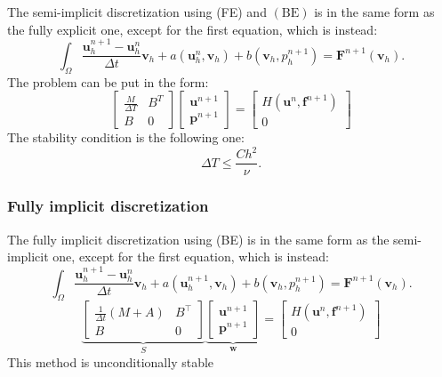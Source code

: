 \documentclass[11pt]{book}
\begin{document}
The semi-implicit discretization using (FE) and $(\mathrm{BE})$ is in the same form as the fully explicit one, except for the first equation, which is instead:
\begin{equation*}
\int_{\Omega} \frac{\mathbf{u}_{h}^{n+1}-\mathbf{u}_{h}^{n}}{\Delta t} \mathbf{v}_{h}+a\left(\mathbf{u}_{h}^{n}, \mathbf{v}_{h}\right)+b\left(\mathbf{v}_{h}, p_{h}^{n+1}\right)=\mathbf{F}^{n+1}\left(\mathbf{v}_{h}\right).
\end{equation*}
The problem can be put in the form:
\begin{equation*}
\begin{bmatrix}
\frac{M}{\Delta T} & B^{T} \\
B & 0 
\end{bmatrix}
\begin{bmatrix}
\mathbf{u}^{n+1} \\
\mathbf{p}^{n+1}
\end{bmatrix}
=
\begin{bmatrix} H (\mathbf{u}^{n},\mathbf{f}^{n+1}) \\ 0 \end{bmatrix}
\end{equation*}
The stability condition is the following one:
$$\Delta T \leq \frac{Ch^2}{\nu}.$$
\subsubsection*{Fully implicit discretization}

The fully implicit discretization using (BE) is in the same form as the semi-implicit one, except for the first equation, which is instead:
\begin{equation*}
\int_{\Omega} \frac{\mathbf{u}_{h}^{n+1}-\mathbf{u}_{h}^{n}}{\Delta t} \mathbf{v}_{h}+a\left(\mathbf{u}_{h}^{n+1}, \mathbf{v}_{h}\right)+b\left(\mathbf{v}_{h}, p_{h}^{n+1}\right)=\mathbf{F}^{n+1}\left(\mathbf{v}_{h}\right).
\end{equation*}
\begin{equation*}
\underbrace{\begin{bmatrix}
\frac{1}{\Delta t}(M+A) & B^{\top} \\
B & 0
\end{bmatrix}} _{S} \underbrace{\begin{bmatrix}
\mathbf{u}^{n+1} \\
\mathbf{p}^{n+1}
\end{bmatrix}}_{\mathbf{w}}
=
\begin{bmatrix} H (\mathbf{u}^{n},\mathbf{f}^{n+1}) \\ 0 \end{bmatrix}
\end{equation*}
This method is unconditionally stable
\end{document}
